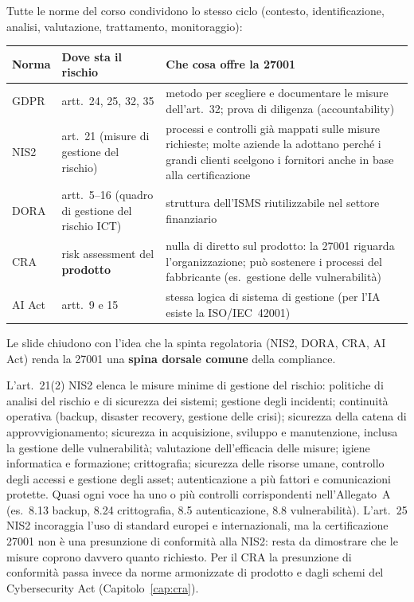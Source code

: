 Tutte le norme del corso condividono lo stesso ciclo (contesto, identificazione, analisi, valutazione,
trattamento, monitoraggio):
\begin{center}
\small
\begin{tabularx}{\linewidth}{>{\raggedright\arraybackslash}p{2.6cm} >{\raggedright\arraybackslash}p{3.2cm} X}
\toprule
\textbf{Norma} & \textbf{Dove sta il rischio} & \textbf{Che cosa offre la 27001}\\
\midrule
GDPR & artt.~24, 25, 32, 35 & metodo per scegliere e documentare le misure dell'art.~32; prova di diligenza
  (accountability)\\
NIS2 & art.~21 (misure di gestione del rischio) & processi e controlli già mappati sulle misure richieste;
  molte aziende la adottano perché i grandi clienti scelgono i fornitori anche in base alla certificazione\\
DORA & artt.~5--16 (quadro di gestione del rischio ICT) & struttura dell'ISMS riutilizzabile nel settore
  finanziario\\
CRA & risk assessment del \textbf{prodotto} & nulla di diretto sul prodotto: la 27001 riguarda
  l'organizzazione; può sostenere i processi del fabbricante (es.\ gestione delle vulnerabilità)\\
AI Act & artt.~9 e 15 & stessa logica di sistema di gestione (per l'IA esiste la ISO/IEC~42001)\\
\bottomrule
\end{tabularx}
\end{center}
Le slide chiudono con l'idea che la spinta regolatoria (NIS2, DORA, CRA, AI Act) renda la 27001 una
\textbf{spina dorsale comune} della compliance.

\begin{integrazione}
L'art.~21(2) NIS2 elenca le misure minime di gestione del rischio: politiche di analisi del rischio e di
sicurezza dei sistemi; gestione degli incidenti; continuità operativa (backup, disaster recovery, gestione
delle crisi); sicurezza della catena di approvvigionamento; sicurezza in acquisizione, sviluppo e
manutenzione, inclusa la gestione delle vulnerabilità; valutazione dell'efficacia delle misure; igiene
informatica e formazione; crittografia; sicurezza delle risorse umane, controllo degli accessi e gestione
degli asset; autenticazione a più fattori e comunicazioni protette. Quasi ogni voce ha uno o più controlli
corrispondenti nell'Allegato~A (es.\ 8.13 backup, 8.24 crittografia, 8.5 autenticazione, 8.8 vulnerabilità).
L'art.~25 NIS2 incoraggia l'uso di standard europei e internazionali, ma la certificazione 27001 non è una
presunzione di conformità alla NIS2: resta da dimostrare che le misure coprono davvero quanto richiesto.
Per il CRA la presunzione di conformità passa invece da norme armonizzate di prodotto e dagli schemi del
Cybersecurity Act (Capitolo~\ref{cap:cra}).
\end{integrazione}

